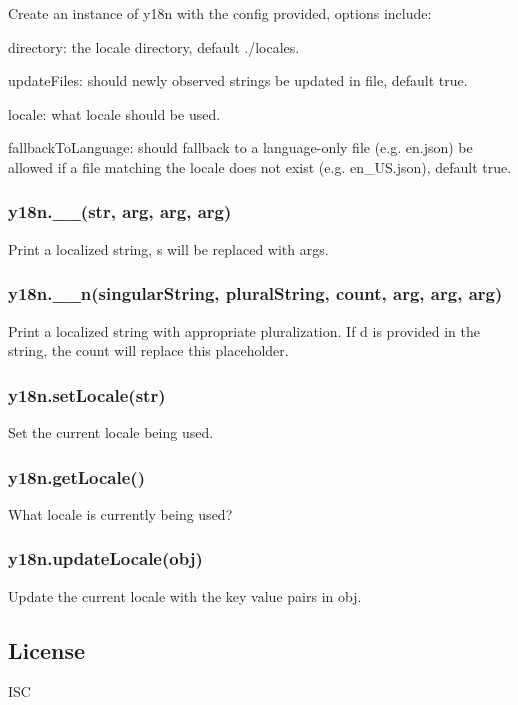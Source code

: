 Create an instance of y18n with the config provided, options include\+:


\begin{DoxyItemize}
\item {\ttfamily directory}\+: the locale directory, default {\ttfamily ./locales}.
\item {\ttfamily update\+Files}\+: should newly observed strings be updated in file, default {\ttfamily true}.
\item {\ttfamily locale}\+: what locale should be used.
\item {\ttfamily fallback\+To\+Language}\+: should fallback to a language-\/only file (e.\+g. {\ttfamily en.\+json}) be allowed if a file matching the locale does not exist (e.\+g. {\ttfamily en\+\_\+\+U\+S.\+json}), default {\ttfamily true}.
\end{DoxyItemize}

\subsubsection*{y18n.\+\_\+\+\_\+(str, arg, arg, arg)}

Print a localized string, {\ttfamily s} will be replaced with {\ttfamily arg}s.

\subsubsection*{y18n.\+\_\+\+\_\+n(singular\+String, plural\+String, count, arg, arg, arg)}

Print a localized string with appropriate pluralization. If {\ttfamily d} is provided in the string, the {\ttfamily count} will replace this placeholder.

\subsubsection*{y18n.\+set\+Locale(str)}

Set the current locale being used.

\subsubsection*{y18n.\+get\+Locale()}

What locale is currently being used?

\subsubsection*{y18n.\+update\+Locale(obj)}

Update the current locale with the key value pairs in {\ttfamily obj}.

\subsection*{License}

I\+SC 
